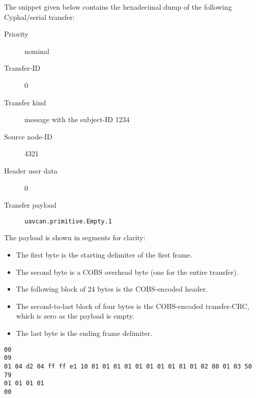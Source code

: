 \begin{remark}
    The snippet given below contains the hexadecimal dump of the following Cyphal/serial transfer:

    \begin{description}
        \item[Priority] nominal
        \item[Transfer-ID] 0
        \item[Transfer kind] message with the subject-ID 1234
        \item[Source node-ID] 4321
        \item[Header user data] 0
        \item[Transfer payload] \verb|uavcan.primitive.Empty.1|
    \end{description}

    The payload is shown in segments for clarity:

    \begin{itemize}
        \item The first byte is the starting delimiter of the first frame.
        \item The second byte is a COBS overhead byte (one for the entire transfer).
        \item The following block of 24 bytes is the COBS-encoded header.
        \item The second-to-last block of four bytes is the COBS-encoded transfer-CRC,
        which is zero as the payload is empty.
        \item The last byte is the ending frame delimiter.
    \end{itemize}

    \begin{verbatim}
00
09
01 04 d2 04 ff ff e1 10 01 01 01 01 01 01 01 01 01 01 02 80 01 03 50 79
01 01 01 01
00
    \end{verbatim}
\end{remark}
